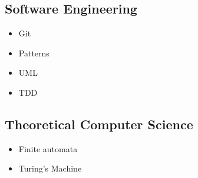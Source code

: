 \documentclass[a4paper,12pt]{article}
\begin{document}
\subsection*{Software Engineering}

\begin{multicols}{2}
\begin{itemize}
    \item Git
    \item Patterns
    \item UML
    \item TDD 
\end{itemize}
\end{multicols}

\subsection*{Theoretical Computer Science}

\begin{multicols}{2}

\begin{itemize}
    \item Finite automata
    \item Turing's Machine
\end{itemize}

\end{multicols}
\end{document}
